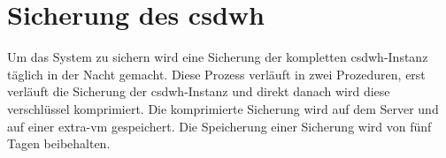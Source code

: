 \chapter{Sicherung des \ac{csdwh}} \label{ch:back}
  Um das System zu sichern wird eine Sicherung der kompletten \ac{csdwh}-Instanz täglich in der Nacht gemacht. Diese Prozess verläuft in zwei Prozeduren, erst verläuft die Sicherung der \ac{csdwh}-Instanz und direkt danach wird diese verschlüssel komprimiert. Die komprimierte Sicherung wird auf dem Server und auf einer extra-\ac{vm} gespeichert. Die Speicherung einer Sicherung wird von fünf Tagen beibehalten.
  